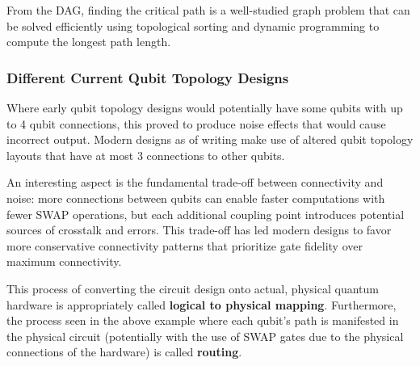 \vspace{0.3cm}

From the DAG, finding the critical path is a well-studied graph problem that
can be solved efficiently using topological sorting and dynamic programming
to compute the longest path length.

\subsubsection*{Different Current Qubit Topology Designs}

Where early qubit topology designs would potentially have some qubits with
up to 4 qubit connections, this proved to produce noise effects that would
cause incorrect output. Modern designs as of writing make use of altered
qubit topology layouts that have at most 3 connections to other qubits.

An interesting aspect is the fundamental trade-off between connectivity and
noise: more connections between qubits can enable faster computations with
fewer SWAP operations, but each additional coupling point introduces
potential sources of crosstalk and errors. This trade-off has led modern
designs to favor more conservative connectivity patterns that prioritize gate
fidelity over maximum connectivity.

This process of converting the circuit design onto actual, physical quantum
hardware is appropriately called \textbf{logical to physical mapping}.
Furthermore, the process seen in the above example where each qubit's path is
manifested in the physical circuit (potentially with the use of SWAP gates
due to the physical connections of the hardware) is called \textbf{routing}.

\vspace{0.3cm}


